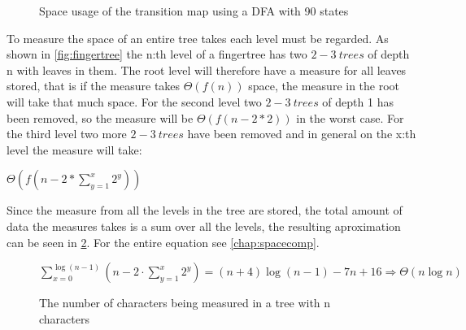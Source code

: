\begin{figure}[!h]
\caption{Space usage of the transition map using a DFA with 90 states\label{fig:IncSpace}}
\end{figure}

To measure the space of an entire tree takes each level must be regarded. As shown
in \cref{fig:fingertree} the n:th level of a fingertree has two $2-3~trees$ of
depth n with leaves in them. The root level will therefore have a measure for
all leaves stored, that is if the measure takes $\Theta(f(n))$ space, the
measure in the root will take that much space. For the second level two
$2-3~trees$ of depth 1 has been removed, so the measure will be $\Theta(f(n-2*2))$
in the worst case. For the third level two more $2-3~trees$ have been removed and
in general on the x:th level the measure will take:
\begin{center}$\Theta(f(n-2*\sum\limits_{y=1}^x2^y))$\end{center}
Since the measure from all the levels in
the tree are stored, the total amount of data the measures takes is a sum over
all the levels, the resulting aproximation can be seen in \cref{fig:MeaChar}.
For the entire equation see \cref{chap:spacecomp}.

\begin{figure}[!h]
\begin{center}
$\sum\limits_{x=0}^{\log (n-1)}(n- 2 \cdot \sum\limits_{y=1}^x2^y) =
(n+4)\log(n-1) - 7n + 16 \Rightarrow \Theta(n\log n)$
\end{center}
\caption{The number of characters being measured in a tree with n characters\label{fig:MeaChar}}
\end{figure}

